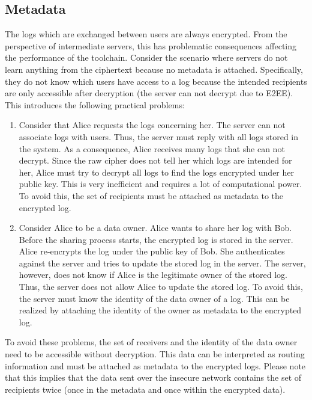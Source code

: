 \documentclass[../main.tex]{subfiles}
\begin{document}
\subsection{Metadata}
\label{sec:metadata}
The logs which are exchanged between users are always encrypted.
From the perspective of intermediate servers, this has problematic consequences affecting the performance of the toolchain.
Consider the scenario where servers do not learn anything from the ciphertext because no metadata is attached.
Specifically, they do not know which users have access to a log because the intended recipients are only accessible after decryption (the server can not decrypt due to E2EE).
This introduces the following practical problems:
\begin{enumerate}
    \item 
    Consider that Alice requests the logs concerning her.
    The server can not associate logs with users.
    Thus, the server must reply with all logs stored in the system.
    As a consequence, Alice receives many logs that she can not decrypt.
    Since the raw cipher does not tell her which logs are intended for her, Alice must try to decrypt all logs to find the logs encrypted under her public key.
    This is very inefficient and requires a lot of computational power.
    To avoid this, the set of recipients must be attached as metadata to the encrypted log.
    \item 
    Consider Alice to be a data owner.
    Alice wants to share her log with Bob.
    Before the sharing process starts, the encrypted log is stored in the server.
    Alice re-encrypts the log under the public key of Bob.
    She authenticates against the server and tries to update the stored log in the server.
    The server, however, does not know if Alice is the legitimate owner of the stored log.
    Thus, the server does not allow Alice to update the stored log.
    To avoid this, the server must know the identity of the data owner of a log.
    This can be realized by attaching the identity of the owner as metadata to the encrypted log.
\end{enumerate}
To avoid these problems, the set of receivers and the identity of the data owner need to be accessible without decryption.
This data can be interpreted as routing information and must be attached as metadata to the encrypted logs.
Please note that this implies that the data sent over the insecure network contains the set of recipients twice (once in the metadata and once within the encrypted data).
\end{document}
